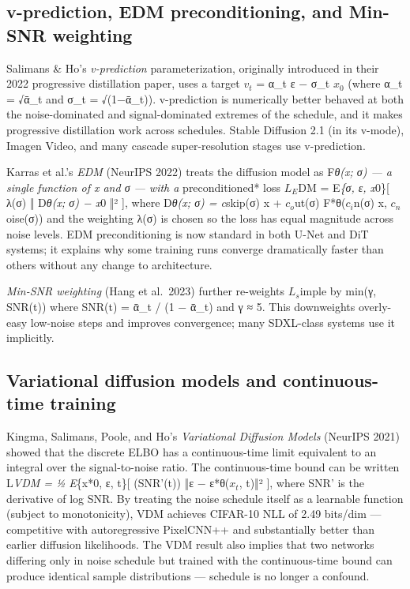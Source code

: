 \documentclass{article}
\begin{document}
\subsection{v-prediction, EDM preconditioning, and Min-SNR weighting}\label{v-prediction-edm-preconditioning-and-min-snr-weighting}

Salimans \& Ho's \emph{v-prediction} parameterization, originally introduced in their 2022 progressive distillation paper, uses a target \(v_t\) = α\_t ε − σ\_t \(x_0\) (where α\_t = √ᾱ\_t and σ\_t = √(1−ᾱ\_t)). v-prediction is numerically better behaved at both the noise-dominated and signal-dominated extremes of the schedule, and it makes progressive distillation work across schedules. Stable Diffusion 2.1 (in its v-mode), Imagen Video, and many cascade super-resolution stages use v-prediction.

Karras et al.'s \emph{EDM} (NeurIPS 2022) treats the diffusion model as F\emph{θ(x; σ) --- a single function of x and σ --- with a }preconditioned* loss \(L_E\)DM = E\emph{\{σ, ε, x}0\}{[} λ(σ) ‖ D\emph{θ(x; σ) − x}0 ‖² {]}, where D\emph{θ(x; σ) = c}skip(σ) x + \(c_o\)ut(σ) F*θ(\(c_i\)n(σ) x, \(c_n\)oise(σ)) and the weighting λ(σ) is chosen so the loss has equal magnitude across noise levels. EDM preconditioning is now standard in both U-Net and DiT systems; it explains why some training runs converge dramatically faster than others without any change to architecture.

\emph{Min-SNR weighting} (Hang et al.~2023) further re-weights \(L_s\)imple by min(γ, SNR(t)) where SNR(t) = ᾱ\_t / (1 − ᾱ\_t) and γ ≈ 5. This downweights overly-easy low-noise steps and improves convergence; many SDXL-class systems use it implicitly.

\subsection{Variational diffusion models and continuous-time training}\label{variational-diffusion-models-and-continuous-time-training}

Kingma, Salimans, Poole, and Ho's \emph{Variational Diffusion Models} (NeurIPS 2021) showed that the discrete ELBO has a continuous-time limit equivalent to an integral over the signal-to-noise ratio. The continuous-time bound can be written L\emph{VDM = ½ E}\{x*0, ε, t\}{[} (SNR'(t)) ‖ε − ε*θ(\(x_t\), t)‖² {]}, where SNR' is the derivative of log SNR. By treating the noise schedule itself as a learnable function (subject to monotonicity), VDM achieves CIFAR-10 NLL of 2.49 bits/dim --- competitive with autoregressive PixelCNN++ and substantially better than earlier diffusion likelihoods. The VDM result also implies that two networks differing only in noise schedule but trained with the continuous-time bound can produce identical sample distributions --- schedule is no longer a confound.
\end{document}
